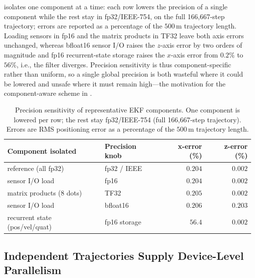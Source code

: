 \documentclass[research]{fcs}
\begin{document}
 isolates one component at a time: each row lowers the precision of a single component while the rest stay in fp32/IEEE-754, on the full 166{,}667-step trajectory; errors are reported as a percentage of the $500$\,m trajectory length. Loading sensors in fp16 and the matrix products in TF32 leave both axis errors unchanged, whereas bfloat16 sensor I/O raises the $z$-axis error by two orders of magnitude and fp16 recurrent-state storage raises the $x$-axis error from $0.2\%$ to $56\%$, i.e., the filter diverges. Precision sensitivity is thus component-specific rather than uniform, so a single global precision is both wasteful where it could be lowered and unsafe where it must remain high---the motivation for the component-aware scheme in .

\begin{table}[H]
  \centering
  \caption{Precision sensitivity of representative EKF components. One component is lowered per row; the rest stay fp32/IEEE-754 (full 166{,}667-step trajectory). Errors are RMS positioning error as a percentage of the $500$\,m trajectory length.}
  \label{tab:precision-isolation}
  \begin{tabular}{@{}llrr@{}}
    \toprule
    Component isolated & Precision knob & x-error (\%) & z-error (\%) \\
    \midrule
    reference (all fp32) & fp32 / IEEE & $0.204$ & $0.002$ \\
    sensor I/O load & fp16 & $0.204$ & $0.002$ \\
    matrix products (8 dots) & TF32 & $0.205$ & $0.002$ \\
    sensor I/O load & bfloat16 & $0.206$ & $0.203$ \\
    recurrent state (pos/vel/quat) & fp16 storage & $56.4$ & $0.002$ \\
    \bottomrule
  \end{tabular}
\end{table}

\subsection{Independent Trajectories Supply Device-Level Parallelism}
\label{subsec:motivation-trajectories}
\end{document}

